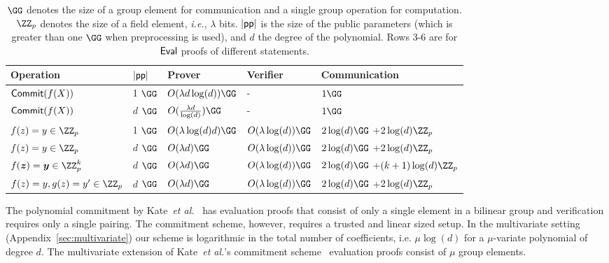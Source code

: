 \begin{table}[!htp]
\begin{small}
\begin{tabular}{l|l||l|l|l}
	Operation & $|\textsf{pp}|$  & Prover & Verifier & Communication\\
	\hline
    $\textsf{{Commit}}(f(X))$ & 1 $\GG$ & $O(\lambda d\log(d))\GG$ & - & $1 \GG$\\
    $\textsf{{Commit}}(f(X))$ & $d$ $\GG$ & $O(\frac{\lambda d}{\log(d)}) \GG$ & - & $1 \GG$\\
    $f(z)=y\in \ZZ_p$  & 1 $\GG$ & $O(\lambda  \log(d) d)\GG$ & $O(\lambda \log(d))\GG$ & $2 \log(d) \GG$ +$2 \log(d) \ZZ_p$ \\
      $f(z)=y\in \ZZ_p$  & $d$ $\GG$ & $O(\lambda d)\GG$ & $O(\lambda \log(d))\GG$ & $2 \log(d) \GG$ +$2 \log(d) \ZZ_p$ \\
       $f(\boldsymbol{z})=\boldsymbol{y}\in \ZZ^k_p$  & $d$ $\GG$ & $O(\lambda d)\GG$ & $O(\lambda \log(d))\GG$ & $2 \log(d) \GG$ +$(k+1) \log(d) \ZZ_p$ \\
                $f(z)=y, g(z)=y'\in \ZZ_p$  & $d$ $\GG$ & $O(\lambda d)\GG$ & $O(\lambda \log(d))\GG$ & $2 \log(d) \GG$ +$2 \log(d) \ZZ_p$ \\

\end{tabular}

\caption{$\GG$ denotes the size of a group element for communication and a single group operation for computation. $\ZZ_p$ denotes the size of a field element, \emph{i.e.}, $\lambda$ bits. $|\textsf{pp}|$ is the size of the public parameters (which is greater than one $\GG$ when preprocessing is used), and $d$ the degree of the polynomial. Rows 3-6 are for $\textsf{{Eval}}$ proofs of different statements.}
\label{tab:performance}
\end{small}
\end{table}

The polynomial commitment by Kate~\emph{et al.}~\cite{AC:KatZavGol10} has evaluation proofs that consist of only a single element in a bilinear group and verification requires only a single pairing. The commitment scheme, however, requires a trusted and linear sized setup. In the multivariate setting (Appendix~\ref{sec:multivariate}) our scheme is logarithmic in the total number of coefficients, i.e. $\mu\log(d)$ for a $\mu$-variate polynomial of degree $d$. The multivariate extension of Kate~\emph{et al.}'s commitment scheme~\cite{SP:ZGKPP17} evaluation proofs consist of $\mu$ group elements.

	



